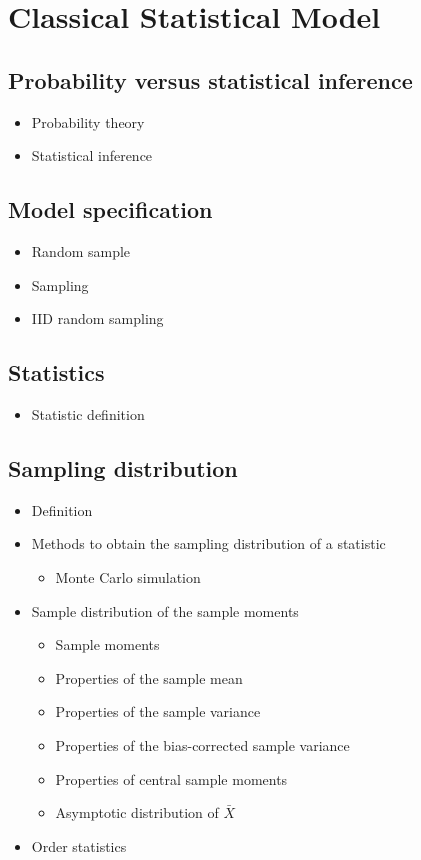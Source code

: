 \chapter{Classical Statistical Model}

\section{Probability versus statistical inference}
\begin{itemize}
    \item Probability theory
    \item Statistical inference
\end{itemize}

\section{Model specification}
\begin{itemize}
    \item Random sample
    \item Sampling
    \item IID random sampling
\end{itemize}

\section{Statistics}
\begin{itemize}
    \item Statistic definition
\end{itemize}

\section{Sampling distribution}
\begin{itemize}
    \item Definition
    \item Methods to obtain the sampling distribution of a statistic
        \begin{itemize}
            \item Monte Carlo simulation
        \end{itemize}
    \item Sample distribution of the sample moments
        \begin{itemize}
            \item Sample moments
            \item Properties of the sample mean
            \item Properties of the sample variance
            \item Properties of the bias-corrected sample variance
            \item Properties of central sample moments
            \item Asymptotic distribution of $\bar{X}$
        \end{itemize}
    \item Order statistics
\end{itemize}